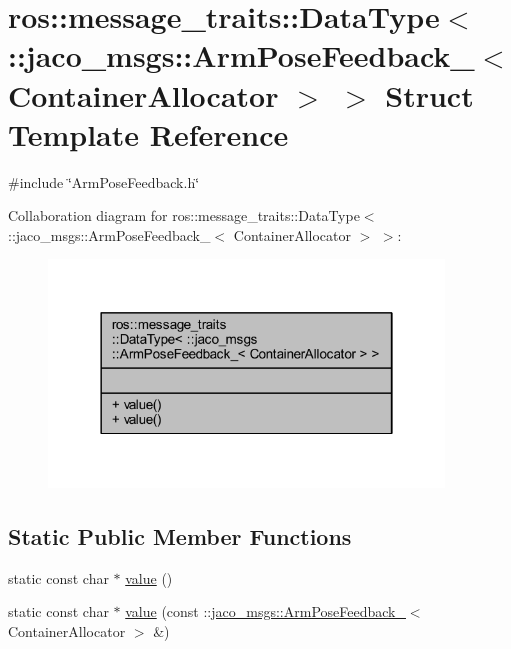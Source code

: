 \hypertarget{structros_1_1message__traits_1_1DataType_3_01_1_1jaco__msgs_1_1ArmPoseFeedback___3_01ContainerAllocator_01_4_01_4}{}\section{ros\+:\+:message\+\_\+traits\+:\+:Data\+Type$<$ \+:\+:jaco\+\_\+msgs\+:\+:Arm\+Pose\+Feedback\+\_\+$<$ Container\+Allocator $>$ $>$ Struct Template Reference}
\label{structros_1_1message__traits_1_1DataType_3_01_1_1jaco__msgs_1_1ArmPoseFeedback___3_01ContainerAllocator_01_4_01_4}


{\ttfamily \#include \char`\"{}Arm\+Pose\+Feedback.\+h\char`\"{}}



Collaboration diagram for ros\+:\+:message\+\_\+traits\+:\+:Data\+Type$<$ \+:\+:jaco\+\_\+msgs\+:\+:Arm\+Pose\+Feedback\+\_\+$<$ Container\+Allocator $>$ $>$\+:
\nopagebreak
\begin{figure}[H]
\begin{center}
\leavevmode
\includegraphics[width=298pt]{d7/d21/structros_1_1message__traits_1_1DataType_3_01_1_1jaco__msgs_1_1ArmPoseFeedback___3_01ContainerAllocator_01_4_01_4__coll__graph}
\end{center}
\end{figure}
\subsection*{Static Public Member Functions}
\begin{DoxyCompactItemize}
\item 
static const char $\ast$ \hyperlink{structros_1_1message__traits_1_1DataType_3_01_1_1jaco__msgs_1_1ArmPoseFeedback___3_01ContainerAllocator_01_4_01_4_a5219177beb6baf51d4e05615b68d3912}{value} ()
\item 
static const char $\ast$ \hyperlink{structros_1_1message__traits_1_1DataType_3_01_1_1jaco__msgs_1_1ArmPoseFeedback___3_01ContainerAllocator_01_4_01_4_a863aa1e23827ce038243da92839f4798}{value} (const \+::\hyperlink{structjaco__msgs_1_1ArmPoseFeedback__}{jaco\+\_\+msgs\+::\+Arm\+Pose\+Feedback\+\_\+}$<$ Container\+Allocator $>$ \&)
\end{DoxyCompactItemize}



